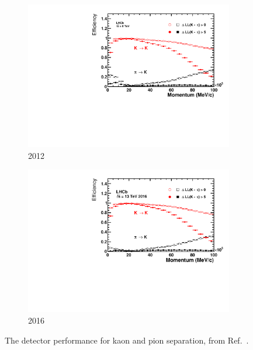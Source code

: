 \begin{figure}[!h]
    \centering
    \begin{subfigure}[t]{0.4\textwidth}
        \centering        
        \includegraphics[width=1.0\textwidth]{figs/Detector/rich_k_pi_2012.pdf}
        \caption{2012}
    \end{subfigure}
    \begin{subfigure}[t]{0.4\textwidth}
        \centering
        \includegraphics[width=1.0\textwidth]{figs/Detector/rich_k_pi_2016.pdf}
        \caption{2016}
    \end{subfigure}
    \caption{The \rich detector performance for kaon and pion separation, from Ref.~\cite{LHCb-DP-2012-003}.}
    \label{fig:Dec_rich_k_pi}   
\end{figure}


